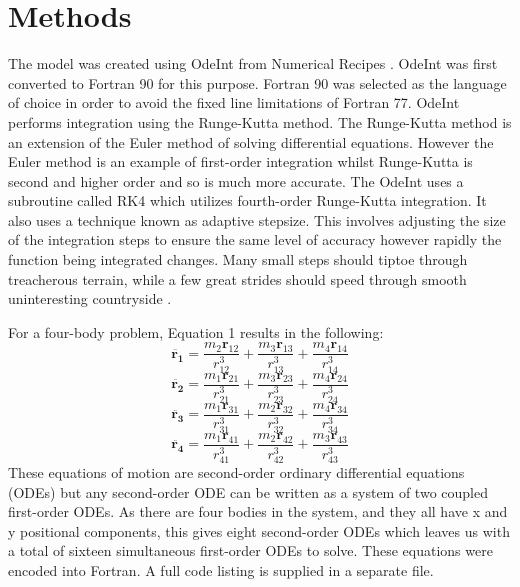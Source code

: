 \documentclass[a4paper,12pt]{article}
\begin{document}
\newpage
\section{Methods}
The model was created using OdeInt from Numerical Recipes \citep{press}. OdeInt was first converted to Fortran 90 for this purpose.
Fortran 90 was selected as the language of choice in order to avoid the fixed line limitations of Fortran 77.
OdeInt performs integration using the Runge-Kutta method. The Runge-Kutta method is an extension of the Euler method of solving differential equations. However the Euler method
is an example of first-order integration whilst Runge-Kutta is second and higher order and so is much more accurate. The OdeInt uses a subroutine called RK4 which utilizes fourth-order Runge-Kutta integration.
It also uses a technique known as adaptive stepsize. This involves adjusting the size of the integration steps to ensure the same level of accuracy however rapidly the function being integrated changes.
Many small steps should tiptoe through treacherous terrain, while a few great strides should speed through smooth uninteresting countryside \citep{press}.

For a four-body problem, Equation 1 results in the following:
\begin{equation}
\ddot{\mathbf{r_1}}=\frac{m_2\mathbf{r}_{12}}{r^3_{12}}+\frac{m_3\mathbf{r}_{13}}{r^3_{13}}+\frac{m_4\mathbf{r}_{14}}{r^3_{14}}
\end{equation}
\begin{equation}
\ddot{\mathbf{r_2}}=\frac{m_1\mathbf{r}_{21}}{r^3_{21}}+\frac{m_3\mathbf{r}_{23}}{r^3_{23}}+\frac{m_4\mathbf{r}_{24}}{r^3_{24}}
\end{equation}
\begin{equation}
\ddot{\mathbf{r_3}}=\frac{m_1\mathbf{r}_{31}}{r^3_{31}}+\frac{m_2\mathbf{r}_{32}}{r^3_{32}}+\frac{m_4\mathbf{r}_{34}}{r^3_{34}}
\end{equation}
\begin{equation}
\ddot{\mathbf{r_4}}=\frac{m_1\mathbf{r}_{41}}{r^3_{41}}+\frac{m_2\mathbf{r}_{42}}{r^3_{42}}+\frac{m_3\mathbf{r}_{43}}{r^3_{43}}
\end{equation}
These equations of motion are second-order ordinary differential equations (ODEs) but any second-order ODE can be written as a system
of two coupled first-order ODEs. As there are four bodies in the system, and they all have x and y positional components, this gives eight second-order 
ODEs which leaves us with a total of sixteen simultaneous first-order ODEs to solve.
These equations were encoded into Fortran. 
A full code listing is supplied in a separate file.
\end{document}

